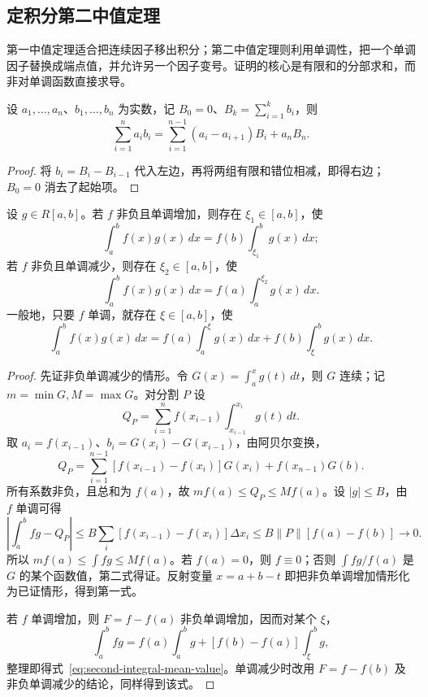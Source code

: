 \documentclass[UTF8,12pt,a4paper,fontset=fandol]{ctexbook}
\begin{document}
\subsection{定积分第二中值定理}
\label{subsec:second-integral-mean-value-theorem}

第一中值定理适合把连续因子移出积分；第二中值定理则利用单调性，把一个单调因子替换成端点值，并允许另一个因子变号。证明的核心是有限和的分部求和，而非对单调函数直接求导。

\begin{lemma}[阿贝尔变换]
\label{lem:abel-summation-finite}
设 $a_1,\ldots,a_n$、$b_1,\ldots,b_n$ 为实数，记 $B_0=0$、$B_k=\sum_{i=1}^kb_i$，则
\begin{equation}
    \sum_{i=1}^na_ib_i
    =\sum_{i=1}^{n-1}(a_i-a_{i+1})B_i+a_nB_n.
    \label{eq:abel-summation-finite}
\end{equation}
\end{lemma}
\begin{proof}
将 $b_i=B_i-B_{i-1}$ 代入左边，再将两组有限和错位相减，即得右边；$B_0=0$ 消去了起始项。
\end{proof}

\begin{theorem}[定积分第二中值定理]
\label{thm:second-integral-mean-value}
设 $g\in R[a,b]$。若 $f$ 非负且单调增加，则存在 $\xi_1\in[a,b]$，使
\[
    \int_a^b f(x)g(x)\,dx=f(b)\int_{\xi_1}^b g(x)\,dx;
\]
若 $f$ 非负且单调减少，则存在 $\xi_2\in[a,b]$，使
\[
    \int_a^b f(x)g(x)\,dx=f(a)\int_a^{\xi_2}g(x)\,dx.
\]
一般地，只要 $f$ 单调，就存在 $\xi\in[a,b]$，使
\begin{equation}
    \int_a^b f(x)g(x)\,dx
    =f(a)\int_a^\xi g(x)\,dx+f(b)\int_\xi^b g(x)\,dx.
    \label{eq:second-integral-mean-value}
\end{equation}
\end{theorem}
\begin{proof}
先证非负单调减少的情形。令 $G(x)=\int_a^x g(t)\,dt$，则 $G$ 连续；记 $m=\min G,M=\max G$。对分割 $P$ 设
\[
    Q_P=\sum_{i=1}^n f(x_{i-1})\int_{x_{i-1}}^{x_i}g(t)\,dt.
\]
取 $a_i=f(x_{i-1})$、$b_i=G(x_i)-G(x_{i-1})$，由阿贝尔变换，
\[
    Q_P=\sum_{i=1}^{n-1}[f(x_{i-1})-f(x_i)]G(x_i)
          +f(x_{n-1})G(b).
\]
所有系数非负，且总和为 $f(a)$，故 $mf(a)\leq Q_P\leq Mf(a)$。设 $|g|\leq B$，由 $f$ 单调可得
\[
    \left|\int_a^bfg-Q_P\right|
    \leq B\sum_i[f(x_{i-1})-f(x_i)]\Delta x_i
    \leq B\|P\|[f(a)-f(b)]\longrightarrow0.
\]
所以 $mf(a)\leq\int fg\leq Mf(a)$。若 $f(a)=0$，则 $f\equiv0$；否则 $\int fg/f(a)$ 是 $G$ 的某个函数值，第二式得证。反射变量 $x=a+b-t$ 即把非负单调增加情形化为已证情形，得到第一式。

若 $f$ 单调增加，则 $F=f-f(a)$ 非负单调增加，因而对某个 $\xi$，
\[
    \int_a^bfg=f(a)\int_a^bg+[f(b)-f(a)]\int_\xi^bg,
\]
整理即得式~\eqref{eq:second-integral-mean-value}。单调减少时改用 $F=f-f(b)$ 及非负单调减少的结论，同样得到该式。
\end{proof}
\end{document}
